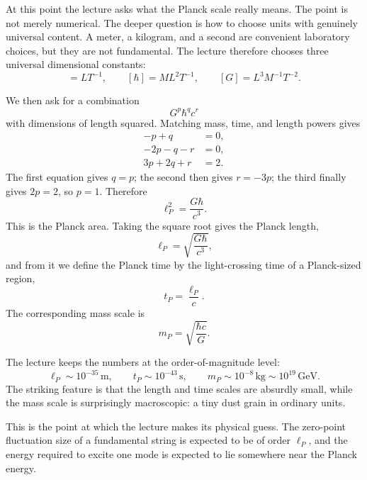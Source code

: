 At this point the lecture asks what the Planck scale really means. The point is not merely numerical. The deeper question is how to choose units with genuinely universal content. A meter, a kilogram, and a second are convenient laboratory choices, but they are not fundamental. The lecture therefore chooses three universal dimensional constants:
\begin{equation}
[c]=LT^{-1},
\qquad
[\hbar]=ML^{2}T^{-1},
\qquad
[G]=L^{3}M^{-1}T^{-2}.
\end{equation}

We then ask for a combination
\begin{equation}
G^{p}\hbar^{q}c^{r}
\end{equation}
with dimensions of length squared. Matching mass, time, and length powers gives
\begin{align}
-p+q&=0,\\
-2p-q-r&=0,\\
3p+2q+r&=2.
\end{align}
The first equation gives \(q=p\); the second then gives \(r=-3p\); the third finally gives \(2p=2\), so \(p=1\). Therefore
\begin{equation}
\ell_{P}^{2}=\frac{G\hbar}{c^{3}}.
\end{equation}
This is the Planck area. Taking the square root gives the Planck length,
\begin{equation}
\ell_{P}=\sqrt{\frac{G\hbar}{c^{3}}},
\end{equation}
and from it we define the Planck time by the light-crossing time of a Planck-sized region,
\begin{equation}
t_{P}=\frac{\ell_{P}}{c}.
\end{equation}
The corresponding mass scale is
\begin{equation}
m_{P}=\sqrt{\frac{\hbar c}{G}}.
\end{equation}

The lecture keeps the numbers at the order-of-magnitude level:
\begin{equation}
\ell_{P}\sim 10^{-35}\,\text{m},
\qquad
t_{P}\sim 10^{-43}\,\text{s},
\qquad
m_{P}\sim 10^{-8}\,\text{kg}\sim 10^{19}\,\text{GeV}.
\end{equation}
The striking feature is that the length and time scales are absurdly small, while the mass scale is surprisingly macroscopic: a tiny dust grain in ordinary units.

This is the point at which the lecture makes its physical guess. The zero-point fluctuation size of a fundamental string is expected to be of order \(\ell_{P}\), and the energy required to excite one mode is expected to lie somewhere near the Planck energy.

